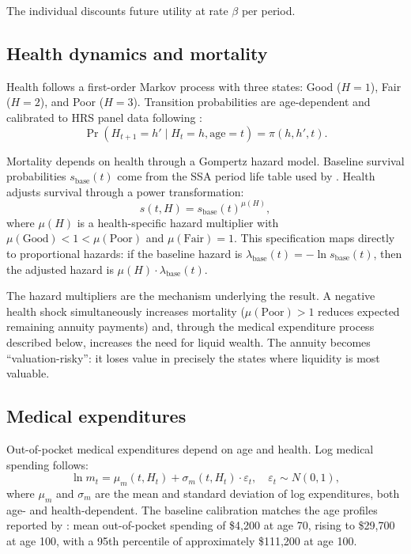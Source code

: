 \documentclass[12pt]{article}
\begin{document}
The individual discounts future utility at rate $\beta$ per period.

\subsection{Health dynamics and mortality}

Health follows a first-order Markov process with three states: Good ($H = 1$), Fair ($H = 2$), and Poor ($H = 3$). Transition probabilities are age-dependent and calibrated to HRS panel data following \citet{denardi2010}:
\begin{equation}
\Pr(H_{t+1} = h' \mid H_t = h, \text{age} = t) = \pi(h, h', t).
\end{equation}

Mortality depends on health through a Gompertz hazard model. Baseline survival probabilities $s_{\text{base}}(t)$ come from the SSA period life table used by \citet{lockwood2012}. Health adjusts survival through a power transformation:
\begin{equation}
\label{eq:survival}
s(t, H) = s_{\text{base}}(t)^{\mu(H)},
\end{equation}
where $\mu(H)$ is a health-specific hazard multiplier with $\mu(\text{Good}) < 1 < \mu(\text{Poor})$ and $\mu(\text{Fair}) = 1$. This specification maps directly to proportional hazards: if the baseline hazard is $\lambda_{\text{base}}(t) = -\ln s_{\text{base}}(t)$, then the adjusted hazard is $\mu(H) \cdot \lambda_{\text{base}}(t)$.

The hazard multipliers are the mechanism underlying the \citet{reichlingsmetters2015} result. A negative health shock simultaneously increases mortality ($\mu(\text{Poor}) > 1$ reduces expected remaining annuity payments) and, through the medical expenditure process described below, increases the need for liquid wealth. The annuity becomes ``valuation-risky'': it loses value in precisely the states where liquidity is most valuable.

\subsection{Medical expenditures}

Out-of-pocket medical expenditures depend on age and health. Log medical spending follows:
\begin{equation}
\label{eq:medical}
\ln m_{t} = \mu_m(t, H_t) + \sigma_m(t, H_t) \cdot \varepsilon_t, \quad \varepsilon_t \sim N(0, 1),
\end{equation}
where $\mu_m$ and $\sigma_m$ are the mean and standard deviation of log expenditures, both age- and health-dependent. The baseline calibration matches the age profiles reported by \citet{jones2018}: mean out-of-pocket spending of \$4,200 at age 70, rising to \$29,700 at age 100, with a 95th percentile of approximately \$111,200 at age 100.
\end{document}
